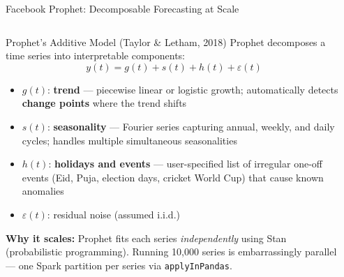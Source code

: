 \documentclass[aspectratio=169,10pt]{beamer}
\begin{document}
\begin{frame}{Facebook Prophet: Decomposable Forecasting at Scale}
  \begin{columns}[T]
      \begin{block}{Prophet's Additive Model (Taylor \& Letham, 2018)}
        Prophet decomposes a time series into interpretable components:
        \[y(t) = g(t) + s(t) + h(t) + \varepsilon(t)\]
        \begin{itemize}
          \item $g(t)$: \textbf{trend} --- piecewise linear or logistic growth; automatically detects \textbf{change points} where the trend shifts
          \item $s(t)$: \textbf{seasonality} --- Fourier series capturing annual, weekly, and daily cycles; handles multiple simultaneous seasonalities
          \item $h(t)$: \textbf{holidays and events} --- user-specified list of irregular one-off events (Eid, Puja, election days, cricket World Cup) that cause known anomalies
          \item $\varepsilon(t)$: residual noise (assumed i.i.d.)
        \end{itemize}
        \vspace{4pt}
        \textbf{Why it scales:}  Prophet fits each series \textit{independently} using Stan (probabilistic programming).  Running 10{,}000 series is embarrassingly parallel --- one Spark partition per series via \texttt{applyInPandas}.
      \end{block}

      \begin{center}
\end{center}
\end{columns}
\end{frame}
\end{document}
